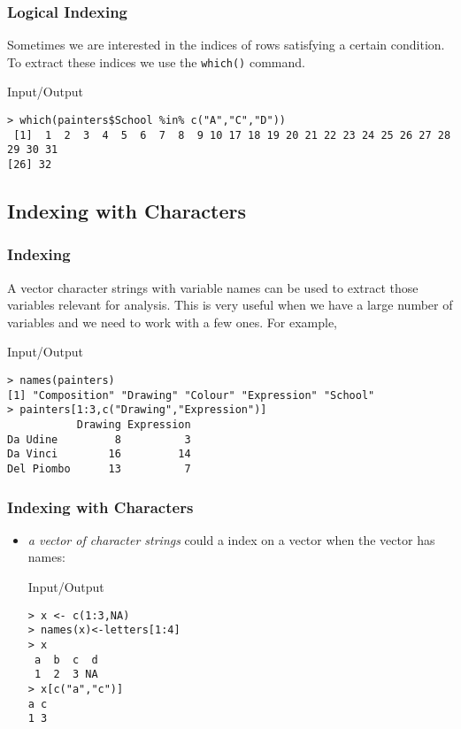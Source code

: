 \documentclass[xcolor={table},c]{beamer}
\begin{document}
\begin{frame}[fragile]\frametitle{Logical Indexing}
Sometimes we are interested in the indices of rows satisfying a certain condition. To extract these indices we use the \texttt{which()} command.
\begin{exampleblock}{Input/Output}\small
\begin{verbatim}
> which(painters$School %in% c("A","C","D"))
 [1]  1  2  3  4  5  6  7  8  9 10 17 18 19 20 21 22 23 24 25 26 27 28 29 30 31
[26] 32
\end{verbatim}
\end{exampleblock}
\end{frame}


\subsection{Indexing with Characters}
\begin{frame}[fragile]\frametitle{Indexing}
A vector character strings with variable names can be used to extract those variables relevant for analysis. This is very useful when we have a large number of variables and we need to work with a few ones. For example,
\begin{exampleblock}{Input/Output}\small
\begin{verbatim}
> names(painters)
[1] "Composition" "Drawing" "Colour" "Expression" "School"
> painters[1:3,c("Drawing","Expression")]
           Drawing Expression
Da Udine         8          3
Da Vinci        16         14
Del Piombo      13          7
\end{verbatim}
\end{exampleblock}
\end{frame}



\begin{frame}[fragile]\frametitle{Indexing with Characters} %
\begin{itemize}
\item \emph{a vector of character strings} could a index on a vector when the vector has names:
  \begin{exampleblock}{Input/Output}
\begin{verbatim}
> x <- c(1:3,NA)
> names(x)<-letters[1:4]
> x
 a  b  c  d
 1  2  3 NA
> x[c("a","c")]
a c
1 3
\end{verbatim}
  \end{exampleblock}
\end{itemize}
\end{frame}
\end{document}
